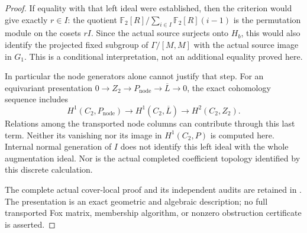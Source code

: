 \begin{proof}
If equality with that left ideal were established, then the
criterion would give exactly $r\in I$: the quotient
$\mathbb F_2[R]/\sum_{i\in I}\mathbb F_2[R](i-1)$ is the
permutation module on the cosets $rI$. Since the actual source
surjects onto $H_b$, this would also identify the projected fixed
subgroup of $\Gamma/[M,M]$ with the actual source image in $G_1$.
This is a conditional interpretation, not an additional equality
proved here.

In particular the node generators alone cannot justify that step.
For an equivariant presentation
$0\to Z_2\to P_{\mathrm{node}}\to\overline L\to0$, the exact
cohomology sequence includes
\[
 H^1(C_2,P_{\mathrm{node}})
       \longrightarrow H^1(C_2,\overline L)
       \longrightarrow H^2(C_2,Z_2).
\]
Relations among the transported node columns can contribute through
this last term. Neither its vanishing nor its image in
$H^1(C_2,P)$ is computed here. Internal normal generation of $I$
does not identify this left ideal with the whole augmentation ideal.
Nor is the actual completed coefficient topology identified by this
discrete calculation.

\begingroup\raggedright
The complete actual cover-local proof and its independent audits
are retained in
.
The presentation is an exact geometric and algebraic description;
no full transported Fox matrix, membership algorithm, or nonzero
obstruction certificate is asserted.\par
\endgroup
\end{proof}

